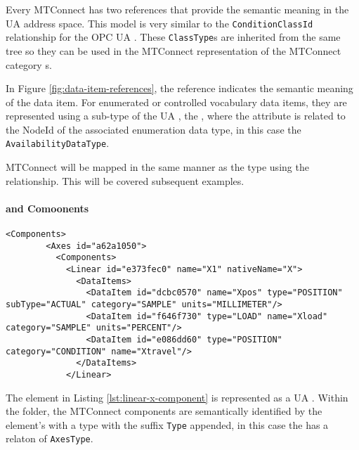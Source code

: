 Every MTConnect  has two references that provide the semantic meaning in the UA address space. This model is very similar to the \texttt{Condition\-Class\-Id} relationship for the OPC UA . These \texttt{Class\-Type}s are inherited from the same tree so they can be used in the MTConnect representation of the MTConnect  category s.



In Figure \ref{fig:data-item-references}, the  reference indicates the semantic meaning of the data item. For enumerated or controlled vocabulary data items, they are represented using a sub-type of the UA , the , where the  attribute is related to the NodeId of the associated enumeration data type, in this case the \texttt{Availability\-Data\-Type}.

MTConnect  will be mapped in the same manner as the type using the  relationship. This will be covered subsequent examples.

\FloatBarrier

\paragraph{ and  Comoonents}

\begin{lstlisting}[firstnumber=last,%
    caption={Components and Conditions},label={lst:linear-x-component}]
      <Components>
        <Axes id="a62a1050">
          <Components>
            <Linear id="e373fec0" name="X1" nativeName="X">
              <DataItems>
                <DataItem id="dcbc0570" name="Xpos" type="POSITION" subType="ACTUAL" category="SAMPLE" units="MILLIMETER"/>
                <DataItem id="f646f730" type="LOAD" name="Xload" category="SAMPLE" units="PERCENT"/>
                <DataItem id="e086dd60" type="POSITION" category="CONDITION" name="Xtravel"/>
              </DataItems>
            </Linear>
\end{lstlisting}

The  element in Listing \ref{lst:linear-x-component} is represented as a UA . Within the folder, the MTConnect components are semantically identified by the element's  with a type with the suffix \texttt{Type} appended, in this case the    has a  relaton of \texttt{AxesType}. 

